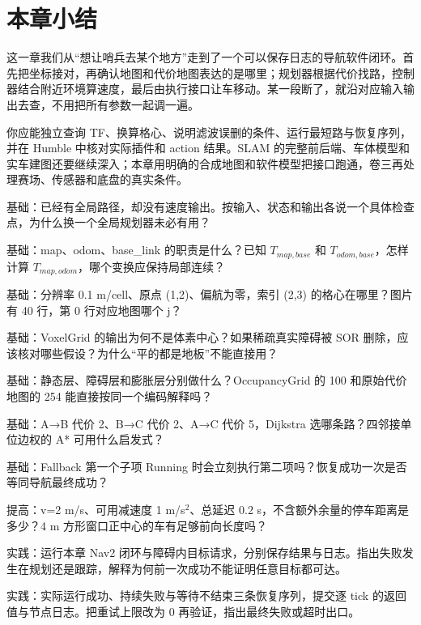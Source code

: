 \section{本章小结}
\begin{conclusion}
这一章我们从“想让哨兵去某个地方”走到了一个可以保存日志的导航软件闭环。首先把坐标接对，再确认地图和代价地图表达的是哪里；规划器根据代价找路，控制器结合附近环境算速度，最后由执行接口让车移动。某一段断了，就沿对应输入输出去查，不用把所有参数一起调一遍。

你应能独立查询 TF、换算格心、说明滤波误删的条件、运行最短路与恢复序列，并在 Humble 中核对实际插件和 action 结果。SLAM 的完整前后端、车体模型和实车建图还要继续深入；本章用明确的合成地图和软件模型把接口跑通，卷三再处理赛场、传感器和底盘的真实条件。
\end{conclusion}

\begin{problemset}
\item\label{prob:nav-chain} 基础：已经有全局路径，却没有速度输出。按输入、状态和输出各说一个具体检查点，为什么换一个全局规划器未必有用？
\item\label{prob:nav-frames} 基础：map、odom、base\_link 的职责是什么？已知 $T_{map,base}$ 和 $T_{odom,base}$，怎样计算 $T_{map,odom}$，哪个变换应保持局部连续？
\item\label{prob:nav-cell} 基础：分辨率 0.1 m/cell、原点 (1,2)、偏航为零，索引 (2,3) 的格心在哪里？图片有 40 行，第 0 行对应地图哪个 j？
\item\label{prob:nav-filter} 基础：VoxelGrid 的输出为何不是体素中心？如果稀疏真实障碍被 SOR 删除，应该核对哪些假设？为什么“平的都是地板”不能直接用？
\item\label{prob:nav-layers} 基础：静态层、障碍层和膨胀层分别做什么？OccupancyGrid 的 100 和原始代价地图的 254 能直接按同一个编码解释吗？
\item\label{prob:nav-dijkstra} 基础：A→B 代价 2、B→C 代价 2、A→C 代价 5，Dijkstra 选哪条路？四邻接单位边权的 A* 可用什么启发式？
\item\label{prob:nav-running} 基础：Fallback 第一个子项 Running 时会立刻执行第二项吗？恢复成功一次是否等同导航最终成功？
\item\label{prob:nav-braking} 提高：v=2 m/s、可用减速度 1 m/s$^2$、总延迟 0.2 s，不含额外余量的停车距离是多少？4 m 方形窗口正中心的车有足够前向长度吗？
\item\label{prob:nav-runtime} 实践：运行本章 Nav2 闭环与障碍内目标请求，分别保存结果与日志。指出失败发生在规划还是跟踪，解释为何前一次成功不能证明任意目标都可达。
\item\label{prob:nav-recovery} 实践：实际运行成功、持续失败与等待不结束三条恢复序列，提交逐 tick 的返回值与节点日志。把重试上限改为 0 再验证，指出最终失败或超时出口。
\end{problemset}

